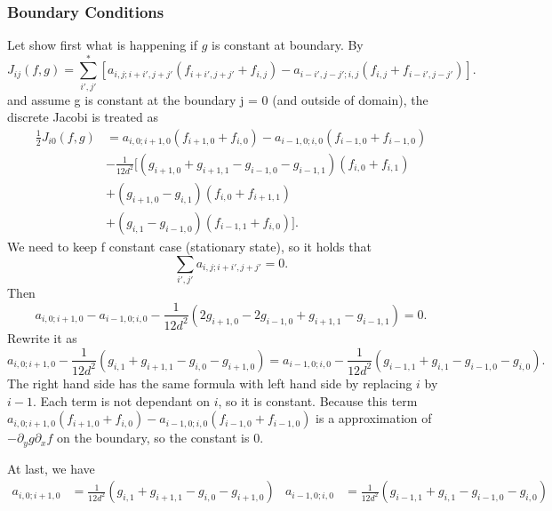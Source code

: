 \subsubsection{Boundary Conditions}

Let show first what is happening if $g$ is constant at boundary. By
\begin{equation}
    J_{ij}(f,g)=\sum^*_{i',j'}[a_{i,j;i+i',j+j'}(f_{i+i',j+j'}+f_{i,j})-a_{i-i',j-j';i,j}(f_{i,j}+f_{i-i',j-j'})].
\end{equation}
and assume g is constant at the boundary j = 0 (and outside of domain), the discrete Jacobi is treated as
\begin{equation}
\begin{aligned}
\frac{1}{2}J_{i0} (f,g) &= a_{i,0;i+1,0}(f_{i+1,0}+f_{i,0})-a_{i-1,0;i,0}(f_{i-1,0}+f_{i-1,0})\\
&-\frac{1}{12d^2}[(g_{i+1,0}+g_{i+1,1}-g_{i-1,0}-g_{i-1,1})(f_{i,0}+f_{i,1})\\
&+(g_{i+1,0}-g_{i,1})(f_{i,0}+f_{i+1,1})\\
&+(g_{i,1}-g_{i-1,0})(f_{i-1,1}+f_{i,0})].
\end{aligned}
\end{equation}
We need to keep f constant case (stationary state), so it holds that $$\sum_{i',j'} a_{i,j;i+i',j+j'}=0.$$ 
Then 
$$a_{i,0;i+1,0}-a_{i-1,0;i,0}-\frac{1}{12d^2}(2g_{i+1,0}-2g_{i-1,0}+g_{i+1,1}-g_{i-1,1})=0.$$
Rewrite it as 
$$a_{i,0;i+1,0}-\frac{1}{12d^2}(g_{i,1}+g_{i+1,1}-g_{i,0}-g_{i+1,0})=a_{i-1,0;i,0}-\frac{1}{12d^2}(g_{i-1,1}+g_{i,1}-g_{i-1,0}-g_{i,0}).$$
The right hand side has the same formula with left hand side by replacing $i$ by $i-1$. Each term is not dependant on $i$, so it is constant. Because this term $a_{i,0;i+1,0}(f_{i+1,0}+f_{i,0})-a_{i-1,0;i,0}(f_{i-1,0}+f_{i-1,0})$ is a approximation of $-\partial_y g \partial_x f$ on the boundary, so the constant is 0.

At last, we have
\begin{align}
	a_{i,0;i+1,0} & = \frac{1}{12d^2}(g_{i,1}+g_{i+1,1}-g_{i,0}-g_{i+1,0}) &
	a_{i-1,0;i,0} & = \frac{1}{12d^2}(g_{i-1,1}+g_{i,1}-g_{i-1,0}-g_{i,0})
\end{align}

